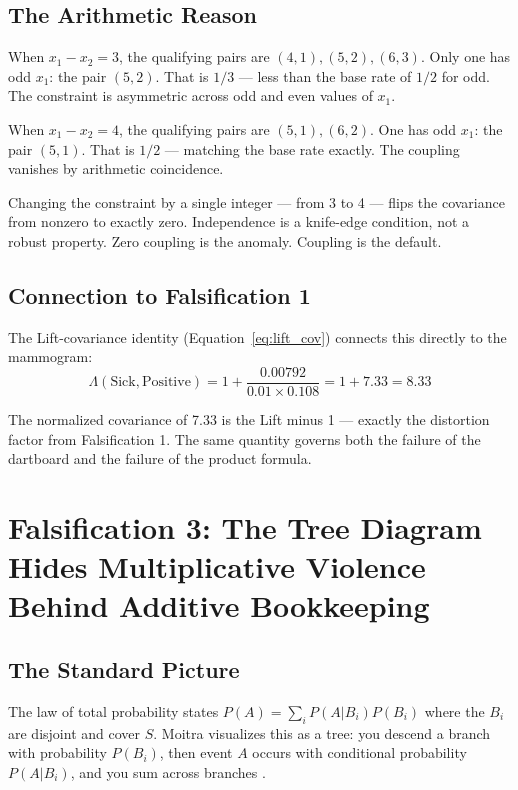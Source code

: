 \documentclass[12pt]{article}
\begin{document}
\subsection{The Arithmetic Reason}

When $x_1 - x_2 = 3$, the qualifying pairs are $(4,1), (5,2), (6,3)$. Only one has odd $x_1$: the pair $(5,2)$. That is $1/3$ --- less than the base rate of $1/2$ for odd. The constraint is asymmetric across odd and even values of $x_1$.

When $x_1 - x_2 = 4$, the qualifying pairs are $(5,1), (6,2)$. One has odd $x_1$: the pair $(5,1)$. That is $1/2$ --- matching the base rate exactly. The coupling vanishes by arithmetic coincidence.

Changing the constraint by a single integer --- from 3 to 4 --- flips the covariance from nonzero to exactly zero. Independence is a knife-edge condition, not a robust property. Zero coupling is the anomaly. Coupling is the default.

\subsection{Connection to Falsification 1}

The Lift-covariance identity (Equation~\ref{eq:lift_cov}) connects this directly to the mammogram:
\begin{equation}
\Lambda(\text{Sick}, \text{Positive}) = 1 + \frac{0.00792}{0.01 \times 0.108} = 1 + 7.33 = 8.33
\end{equation}

The normalized covariance of 7.33 is the Lift minus 1 --- exactly the distortion factor from Falsification 1. The same quantity governs both the failure of the dartboard and the failure of the product formula.

\section{Falsification 3: The Tree Diagram Hides Multiplicative Violence Behind Additive Bookkeeping}

\subsection{The Standard Picture}

The law of total probability states $P(A) = \sum_i P(A|B_i) P(B_i)$ where the $B_i$ are disjoint and cover $S$. Moitra visualizes this as a tree: you descend a branch with probability $P(B_i)$, then event $A$ occurs with conditional probability $P(A|B_i)$, and you sum across branches \cite{moitra2024}.
\end{document}
